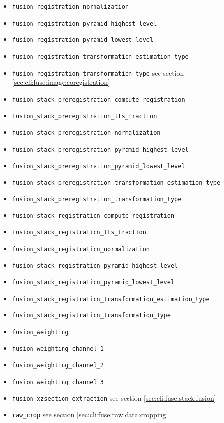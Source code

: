 \begin{itemize}
\item \texttt{fusion\_registration\_normalization}
\item \texttt{fusion\_registration\_pyramid\_highest\_level}
\item \texttt{fusion\_registration\_pyramid\_lowest\_level}
\item \texttt{fusion\_registration\_transformation\_estimation\_type}
\item \texttt{fusion\_registration\_transformation\_type} see section \ref{sec:cli:fuse:image:coregistration}
\item \texttt{fusion\_stack\_preregistration\_compute\_registration}
\item \texttt{fusion\_stack\_preregistration\_lts\_fraction}
\item \texttt{fusion\_stack\_preregistration\_normalization}
\item \texttt{fusion\_stack\_preregistration\_pyramid\_highest\_level}
\item \texttt{fusion\_stack\_preregistration\_pyramid\_lowest\_level}
\item \texttt{fusion\_stack\_preregistration\_transformation\_estimation\_type}
\item \texttt{fusion\_stack\_preregistration\_transformation\_type}
\item \texttt{fusion\_stack\_registration\_compute\_registration}
\item \texttt{fusion\_stack\_registration\_lts\_fraction}
\item \texttt{fusion\_stack\_registration\_normalization}
\item \texttt{fusion\_stack\_registration\_pyramid\_highest\_level}
\item \texttt{fusion\_stack\_registration\_pyramid\_lowest\_level}
\item \texttt{fusion\_stack\_registration\_transformation\_estimation\_type}
\item \texttt{fusion\_stack\_registration\_transformation\_type}
\item \texttt{fusion\_weighting}
\item \texttt{fusion\_weighting\_channel\_1}
\item \texttt{fusion\_weighting\_channel\_2}
\item \texttt{fusion\_weighting\_channel\_3}
\item \texttt{fusion\_xzsection\_extraction} see section \ref{sec:cli:fuse:stack:fusion}
\item \texttt{raw\_crop} see section \ref{sec:cli:fuse:raw:data:cropping}

\end{itemize}
